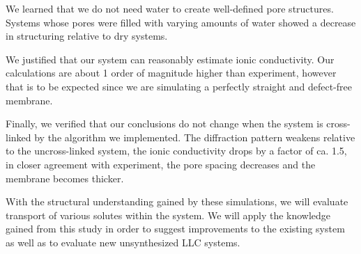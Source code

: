 \documentclass{article}
\begin{document}
  We learned that we do not need water to create well-defined pore structures.
  Systems whose pores were filled with varying amounts of water showed a decrease
  in structuring relative to dry systems. 

  We justified that our system can reasonably estimate ionic conductivity.  Our
  calculations are about 1 order of magnitude higher than experiment, however
  that is to be expected since we are simulating a perfectly straight and
  defect-free membrane. 

  Finally, we verified that our conclusions do not change when the system is
  cross-linked by the algorithm we implemented. The diffraction pattern weakens
  relative to the uncross-linked system, the ionic conductivity drops by a factor
  of ca. 1.5, in closer agreement with experiment, the pore spacing decreases and
  the membrane becomes thicker. 

  With the structural understanding gained by these simulations, we will
  evaluate transport of various solutes within the system. We will apply the
  knowledge gained from this study in order to suggest improvements to the
  existing system as well as to evaluate new unsynthesized LLC systems.

  \clearpage
  
\end{document}
